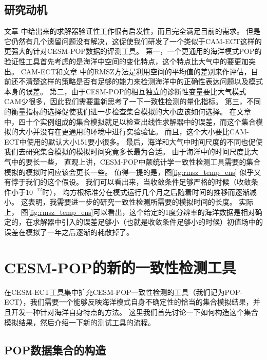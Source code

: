  
\subsection{研究动机}

 
文章 \cite{yong2015} 中给出来的求解器验证性工作很有启发性，而且完全满足目前的需求。 
但是它仍然有几个遗留问题没有解决，这促使我们研发了一个类似于CAM-ECT这样的更强大的针对CESM-POP数据的评测工具。 
第一，一个更通用的海洋模式POP的验证性工具首先考虑的是海洋中空间的变化特点，这个特点比大气中的要更加突出。
CAM-ECT和文章\cite{yong2015} 中的RMSZ方法是利用空间的平均值的差别来作评估，目前还不清楚这样的策略是否有足够的能力来检测海洋中的正确性表达问题以及模式本身的误差。
第二，由于CESM-POP的相互独立的诊断性变量要比大气模式CAM少很多，因此我们需要重新思考了一下一致性检测的量化指标。
第三，不同的衡量指标的选择促使我们进一步检查集合模拟的大小应该如何选择。
在文章\cite{yong2015} 中，四十个实例组成的集合模拟就足以检查出线性求解器中的误差，而这个集合模拟的大小并没有在更通用的环境中进行实验验证。
而且，这个大小要比CAM-ECT中使用的默认大小151要小很多。
最后，海洋和大气中时间尺度的不同也促使我们去研究集合模拟的模拟时间究竟多长最为合适。 
由于海洋中的时间尺度比大气中的要长一些， 直观上讲，CESM-POP中额统计学一致性检测工具需要的集合模拟的模拟时间应该会更长一些。 
值得一提的是，图\ref{fig:rmsz_temp_ens} 似乎又有悖于我们的这个假设。 
我们可以看出来，当收敛条件足够严格的时候（收敛条件小于$10^{-12}$时）， 均方根标准分在模式运行几个月之后随着时间的推移而逐渐减小。
这表明，我需要进一步的研究一致性检测所需要的模拟时间的长度。 
实际上， 图\ref{fig:rmsz_temp_ens}可以看出，这个给定的1度分辨率的海洋数据是相对确定的，在求解器中引入的误差足够小（也就是收敛条件足够小的时候）初值场中的误差在模拟了一年之后逐渐的耗散掉了。




\section{CESM-POP的新的一致性检测工具}\label{sec:newtest}

 
在CESM-ECT工具集中扩充CESM-POP一致性检测的工具（我们记为POP-ECT），我们需要一个能够反映海洋模式自身不确定性的恰当的集合模拟结果，并且开发一种针对海洋自身特点的方法。
这里我们首先讨论一下如何构造这个集合模拟结果，然后介绍一下新的测试工具的流程。 
\subsection{POP数据集合的构造}\label{sec:ensemble}

